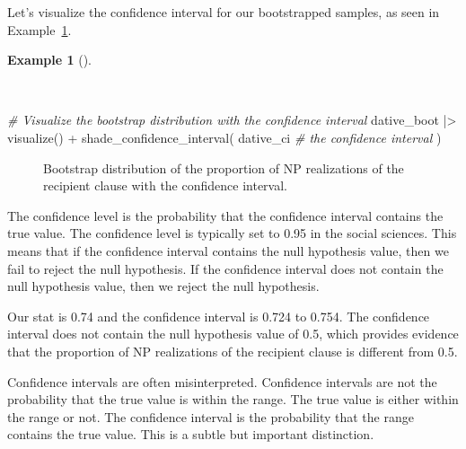 \documentclass[
  letterpaper,
  DIV=11,
  numbers=noendperiod]{scrreprt}
\newenvironment{Shaded}{\begin{snugshade}}{\end{snugshade}}
\newcommand{\CommentTok}[1]{\textcolor[rgb]{0.00,0.00,0.00}{\textit{#1}}}
\newcommand{\FunctionTok}[1]{\textcolor[rgb]{0.00,0.00,0.00}{#1}}
\newcommand{\NormalTok}[1]{\textcolor[rgb]{0.00,0.00,0.00}{#1}}
\newcommand{\SpecialCharTok}[1]{\textcolor[rgb]{0.00,0.00,0.00}{#1}}
\theoremstyle{definition}
\newtheorem{example}{Example}[chapter]
\theoremstyle{remark}
\begin{document}
Let's visualize the confidence interval for our bootstrapped samples, as
seen in Example~\ref{exm-ida-cat-confidence-interval-visualize}.

\begin{example}[]\protect\hypertarget{exm-ida-cat-confidence-interval-visualize}{}\label{exm-ida-cat-confidence-interval-visualize}

~

\begin{Shaded}
\begin{Highlighting}[]
\CommentTok{\# Visualize the bootstrap distribution with the confidence interval}
\NormalTok{dative\_boot }\SpecialCharTok{|\textgreater{}}
  \FunctionTok{visualize}\NormalTok{() }\SpecialCharTok{+}
  \FunctionTok{shade\_confidence\_interval}\NormalTok{(}
\NormalTok{    dative\_ci }\CommentTok{\# the confidence interval}
\NormalTok{  )}
\end{Highlighting}
\end{Shaded}

\begin{figure}[H]


\caption{\label{fig-ida-cat-confidence-interval-visualize}Bootstrap
distribution of the proportion of NP realizations of the recipient
clause with the confidence interval.}

\end{figure}%

\end{example}

The confidence level is the probability that the confidence interval
contains the true value. The confidence level is typically set to 0.95
in the social sciences. This means that if the confidence interval
contains the null hypothesis value, then we fail to reject the null
hypothesis. If the confidence interval does not contain the null
hypothesis value, then we reject the null hypothesis.

Our stat is 0.74 and the confidence interval is 0.724 to 0.754. The
confidence interval does not contain the null hypothesis value of 0.5,
which provides evidence that the proportion of NP realizations of the
recipient clause is different from 0.5.

Confidence intervals are often misinterpreted. Confidence intervals are
not the probability that the true value is within the range. The true
value is either within the range or not. The confidence interval is the
probability that the range contains the true value. This is a subtle but
important distinction.
\end{document}
